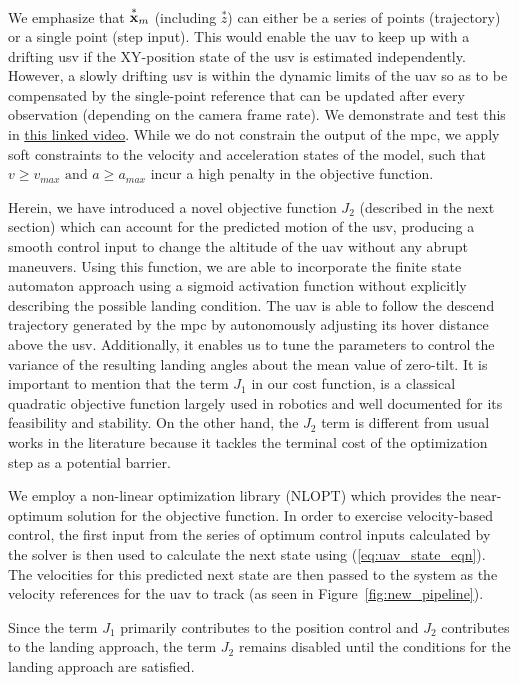 \documentclass[letterpaper, 10 pt, journal, twoside]{IEEEtran}
\begin{document}
We emphasize that $\overset{*}{\mathbf{x}}_m$ (including $\overset{*}{z}$) can either be a series of points (trajectory) or a single point (step input). This would enable the \ac{uav} to keep up with a drifting \ac{usv} if the XY-position state of the usv is estimated independently. However, a slowly drifting \ac{usv} is within the dynamic limits of the \ac{uav} so as to be compensated by the single-point reference that can be updated after every observation (depending on the camera frame rate). We demonstrate and test this in \href{\medialink}{this linked video}.
While we do not constrain the output of the \ac{mpc}, we apply soft constraints to the velocity and acceleration states of the model, such that $v \geq v_{max} \text{ and } a \geq a_{max}$ incur a high penalty in the objective function. 

Herein, we have introduced a novel objective function $J_2$ (described in the next section) which can account for the predicted motion of the \ac{usv}, producing a smooth control input to change the altitude of the \ac{uav} without any abrupt maneuvers. Using this function, we are able to incorporate the finite state automaton approach using a sigmoid activation function without explicitly describing the possible landing condition. The \ac{uav} is able to follow the descend trajectory generated by the \ac{mpc} by autonomously adjusting its hover distance above the \ac{usv}. Additionally, it enables us to tune the parameters to control the variance of the resulting landing angles about the mean value of zero-tilt. It is important to mention that the term $J_1$ in our cost function, is a classical quadratic objective function largely used in robotics and well documented for its feasibility and stability. On the other hand, the $J_2$ term is different from usual works in the literature because it tackles the terminal cost of the optimization step as a potential barrier.


We employ a non-linear optimization library (NLOPT\cite{Gablonsky2001}\cite{NLOPT}) which provides the near-optimum solution for the objective function. In order to exercise velocity-based control, the first input from the series of optimum control inputs calculated by the solver is then used to calculate the next state using (\ref{eq:uav_state_eqn}). The velocities for this predicted next state are then passed to the system as the velocity references for the \ac{uav} to track (as seen in Figure~\ref{fig:new_pipeline}).

Since the term $J_1$ primarily contributes to the position control and $J_2$ contributes to the landing approach, the term $J_2$ remains disabled until the conditions for the landing approach are satisfied.
\end{document}
